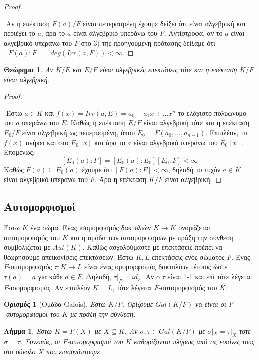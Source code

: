 \documentclass[oneside,a4paper]{article}
\newtheorem{theorem}{Θεώρημα}
\newtheorem{lemma}{Λήμμα}
\newtheorem*{defn}{Ορισμός}
\newcommand {\tl}{\textlatin}
\begin{document}
\begin{proof} $ $
	
	$ $\newline
	Αν η επέκταση $F(a)/F$ είναι πεπερασμένη έχουμε δείξει ότι είναι αλγεβρική και περιέχει το $a$, άρα το $a$ είναι αλγεβρικό υπεράνω του $F$. Αντίστροφα, αν το $a$ είναι αλγεβρικό υπεράνω του $F$ στο $3)$ της προηγούμενη πρότασης δείξαμε ότι $[F(a) : F] = deg(Irr(a,F)) < \infty$. 

\end{proof}

\vspace{0.1cm}
\begin{theorem}Αν $K/E$ και $E/F$ είναι αλγεβρικές επεκτάσεις τότε και η επέκταση $K/F$ είναι αλγεβρική.
\end{theorem}

\begin{proof} $ $

	$ $\newline
	Έστω $a \in K$ και $f(x) = Irr(a,E) = a_0 + a_1 x + \ldots x^n$ το ελάχιστο πολυώνυμο του $a$ υπεράνω του $E$. Καθώς η επέκταση $E/F$ είναι αλγεβρική τότε και η επέκταση $E_0 /F$ είναι αλγεβρική ως πεπερασμένη, όπου $E_0 = F(a_0,\ldots, a_{n-1})$. Επιπλέον, το $f(x)$ ανήκει και στο $E_0 [x]$ και άρα το $a$ είναι αλγεβρικό υπεράνω του $E_0 [x]$. Επομένως:
	$$[E_0 (a) : F] = [E_0 (a) : E_0] [E_0 : F] < \infty$$
	Καθώς $F(a) \subseteq E_0 (a)$ έχουμε ότι $[F(a) :F] < \infty $, δηλαδή το τυχόν $a \in K$ είναι αλγεβρικό υπεράνω του $F$. Άρα η επέκταση $K/F$ είναι αλγεβρική.
\end{proof}

\subsection{Αυτομορφισμοί}
\vspace{1cm}

Έστω $K$ ένα σώμα. Ένας ισομορφισμός δακτυλιών $K \rightarrow K$ ονομάζεται αυτομορφισμός του $K$ και η ομάδα των αυτομορφισμών με πράξη την σύνθεση συμβολίζεται με $Aut(K)$. Καθώς ασχολούμαστε με επεκτάσεις πρέπει να θεωρήσουμε απεικονίσεις επεκτάσεων. Έστω $K,L$ επεκτάσεις ενός σώματος $F$. Ένας $F$-ομομορφισμός $\tau : K \rightarrow L$ είναι ένας ομομορφισμός δακτυλίων τέτοιος ώστε $\tau (a) = a$ για κάθε $a \in F$. Δηλαδή, $\tau |_F = id_F$. Αν o $\tau$ είναι 1-1 και επί τότε λέγεται $F$-ισομορφισμός. Αν επιπλέον $K=L$, τότε λέγεται $F$-αυτομορφισμός του $K$.

\begin{defn}[Ομάδα \tl{Galois}]
	Έστω $K/F$. Ορίζουμε $Gal(K/F)$ να είναι οι $F$-αυτομορφισμοί του $K$ με πράξη την σύνθεση.
\end{defn}
\vspace{0.1cm}
\begin{lemma}
	Έστω $K=F(X)$ με $X \subseteq K$. Αν $\sigma , \tau \in Gal(K/F)$ με $\sigma|_X = \tau|_X $ τότε $\sigma = \tau$. Συνεπώς, οι $F$-αυτομορφισμοί του $K$ καθορίζονται πλήρως από τις εικόνες τους στο σύνολο $X$ που επισυνάπτουμε.
\end{lemma}
\end{document}
